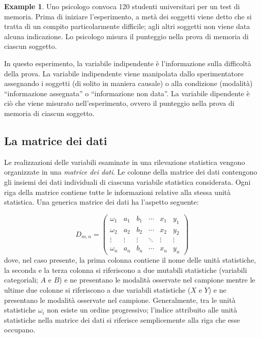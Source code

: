 \documentclass[
  11pt,
]{krantz}
\theoremstyle{definition}
\theoremstyle{definition}
\newtheorem{example}{Example}[chapter]
\theoremstyle{definition}
\theoremstyle{definition}
\theoremstyle{remark}
\begin{document}
\begin{example}
Uno psicologo convoca 120 studenti universitari per un test di memoria. Prima di iniziare l'esperimento, a metà dei soggetti viene detto che si tratta di un compito particolarmente difficile; agli altri soggetti non viene data alcuna indicazione. Lo psicologo misura il punteggio nella prova di memoria di ciascun soggetto.

In questo esperimento, la variabile indipendente è l'informazione sulla difficoltà della prova. La variabile indipendente viene manipolata dallo sperimentatore assegnando i soggetti (di solito in maniera causale) o alla condizione (modalità) ``informazione assegnata'' o ``informazione non data''. La variabile dipendente è ciò che viene misurato nell'esperimento, ovvero il punteggio nella prova di memoria di ciascun soggetto.
\end{example}

\hypertarget{la-matrice-dei-dati}{%
\subsection{La matrice dei dati}\label{la-matrice-dei-dati}}

Le realizzazioni delle variabili esaminate in una rilevazione statistica vengono organizzate in una \emph{matrice dei dati}. Le colonne della matrice dei dati contengono gli insiemi dei dati individuali di ciascuna variabile statistica considerata. Ogni riga della matrice contiene tutte le informazioni relative alla stessa unità statistica. Una generica matrice dei dati ha l'aspetto seguente:

\[
D_{m,n} = 
 \begin{pmatrix}
  \omega_1 & a_{1}   & b_{1}   & \cdots & x_{1} & y_{1}\\
  \omega_2 & a_{2}   & b_{2}   & \cdots & x_{2} & y_{2}\\
  \vdots   & \vdots  & \vdots  & \ddots & \vdots & \vdots  \\
 \omega_n  & a_{n}   & b_{n}   & \cdots & x_{n} & y_{n}
 \end{pmatrix}
 \] \noindent dove, nel caso presente, la prima colonna contiene il nome delle unità statistiche, la seconda e la terza colonna si riferiscono a due mutabili statistiche (variabili categoriali; \(A\) e \(B\)) e ne presentano le modalità osservate nel campione mentre le ultime due colonne si riferiscono a due variabili statistiche (\(X\) e \(Y\)) e ne presentano le modalità osservate nel campione. Generalmente, tra le unità statistiche \(\omega_i\) non esiste un ordine progressivo; l'indice attribuito alle unità statistiche nella matrice dei dati si riferisce semplicemente alla riga che esse occupano.
\end{document}
